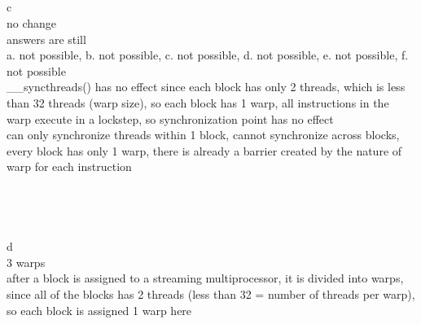 \documentclass[12pt,border=4pt,multi]{article} %
\begin{document}
\\
\\
\\
\\
c\\
no change\\
answers are still\\
a. not possible, b. not possible, c. not possible, d. not possible, e. not possible, f. not possible\\
\_\_syncthreads() has no effect since each block has only 2 threads, which is less than 32 threads (warp size), so each block has 1 warp, all instructions in the warp execute in a lockstep, so synchronization point has no effect\\
can only synchronize threads within 1 block, cannot synchronize across blocks, every block has only 1 warp, there is already a barrier created by the nature of warp for each instruction\\
\\
\\
\\
\\
d\\
3 warps\\
after a block is assigned to a streaming multiprocessor, it is divided into warps, since all of the blocks has 2 threads (less than 32 = number of threads per warp), so each block is assigned 1 warp here\\
\end{document}
